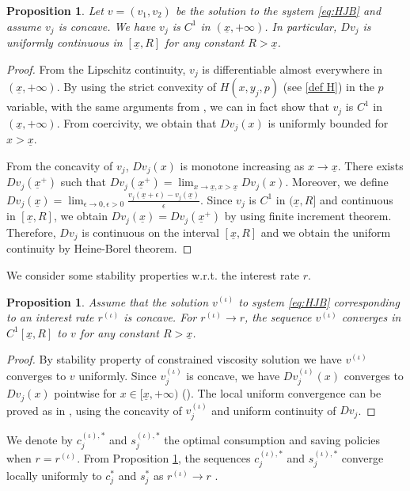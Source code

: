 \documentclass[11pt]{article}
\numberwithin{equation}{section}
\newtheorem{proposition}[theorem]{Proposition}
\newtheorem{corollary}[theorem]{Corollary}
\theoremstyle{Claim}
\def\i{{(\iota)}}
\newcommand{\ux}{{\underline x}}
\theoremstyle{plain}
\begin{document}
\begin{proposition}
Let $v=(v_1,v_2)$ be the solution to the system \eqref{eq:HJB} and assume $v_j$ is concave. We have $v_j$ is $C^1$ in $(\ux,+\infty)$. In particular, $Dv_j$ is uniformly continuous in $[\ux,R]$ for any constant $R>\ux$. 
\end{proposition}
\begin{proof}
From the Lipschitz continuity, $v_j$ is differentiable almost everywhere in $(\ux,+\infty)$. By using the strict convexity of $H(x,y_j,p)$ (see \eqref{def H}) in the $p$ variable, with the same arguments from \cite[Section 5.2, Proposition 5.7]{bardi1997optimal}, we can in fact show that $v_j$ is $C^1$ in $(\ux,+\infty)$. From coercivity, we obtain that $Dv_j(x)$ is uniformly bounded for $x>\ux$. \par
From the concavity of $v_j$, $Dv_j(x)$ is monotone increasing as $x\to \ux$. There exists $Dv_j(\ux^+)$ such that $Dv_j(\ux^+)=\lim_{x\to \ux,x>\ux}Dv_j(x)$. Moreover, we define $Dv_j(\ux)=\lim_{\epsilon \to 0,\epsilon>0}\frac{v_j(\ux+\epsilon)-v_j(\ux)}{\epsilon}$. Since $v_j$ is $C^1$ in $(\ux,R]$ and continuous in $[\ux,R]$, we obtain $Dv_j(\ux)=Dv_j(\ux^+)$ by using finite increment theorem. Therefore, $Dv_j$ is continuous on the interval $[\ux,R]$ and we obtain the uniform continuity by Heine-Borel theorem. 
\end{proof}




We consider some stability properties w.r.t. the interest rate $r$. 
\begin{proposition}\label{stability}
Assume that the solution $v^\i$ to system \eqref{eq:HJB} corresponding to an interest rate $r^\i$ is concave. For $r^\i \to r$, the sequence $v^\i$ converges in $C^1[\ux,R]$ to $v$ for any constant $R>\ux$. 
\end{proposition}
\begin{proof}
By stability property of constrained viscosity solution we have $v^\i$ converges to $v$ uniformly. Since $v_j^\i$ is concave, we have  $D v^\i_j(x)$ converges to $Dv_j(x)$ pointwise for $x\in [\ux,+\infty)$ (\cite[Theorem 3.3.3]{cannarsa2004semiconcave}). The local uniform convergence can be proved as in \cite[Lemma 5.3]{achdou2023mean}, using the concavity of $v^\i_j$ and uniform continuity of $Dv_j$. 
\end{proof}
We denote by $c_j^{\i,*}$ and $s_j^{\i,*}$ the optimal consumption and saving policies when $r=r^\i$. From Proposition \ref{stability}, the sequences $c_j^{\i,*}$ and $s_j^{\i,*}$ converge locally uniformly to $c^*_j$ and $s^*_j$ as $r^\i\to r$ .
\end{document}
